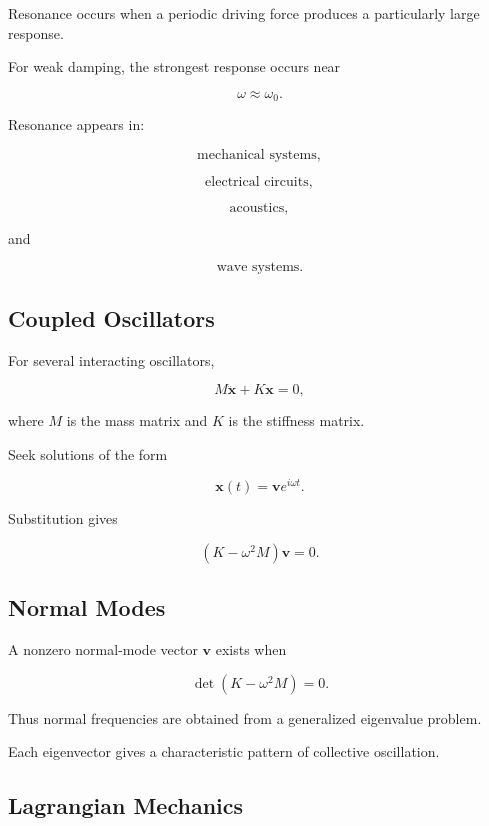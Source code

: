 Resonance occurs when a periodic driving force produces a particularly
large response.

For weak damping, the strongest response occurs near

\[
\boxed{
\omega
\approx
\omega_0.
}
\]

Resonance appears in:

\[
\boxed{
\text{mechanical systems},
}
\]

\[
\boxed{
\text{electrical circuits},
}
\]

\[
\boxed{
\text{acoustics},
}
\]

and

\[
\boxed{
\text{wave systems}.
}
\]

\subsection{Coupled Oscillators}
\label{subsec:coupled-oscillators}

For several interacting oscillators,

\[
\boxed{
M\ddot{\mathbf{x}}
+
K\mathbf{x}
=
0,
}
\]

where \(M\) is the mass matrix and \(K\) is the stiffness matrix.

Seek solutions of the form

\[
\boxed{
\mathbf{x}(t)
=
\mathbf{v}e^{i\omega t}.
}
\]

Substitution gives

\[
\boxed{
(K-\omega^2M)\mathbf{v}
=
0.
}
\]

\subsection{Normal Modes}
\label{subsec:normal-modes}

A nonzero normal-mode vector \(\mathbf{v}\) exists when

\[
\boxed{
\det(K-\omega^2M)=0.
}
\]

Thus normal frequencies are obtained from a generalized eigenvalue problem.

Each eigenvector gives a characteristic pattern of collective oscillation.

\subsection{Lagrangian Mechanics}
\label{subsec:lagrangian-mechanics}


